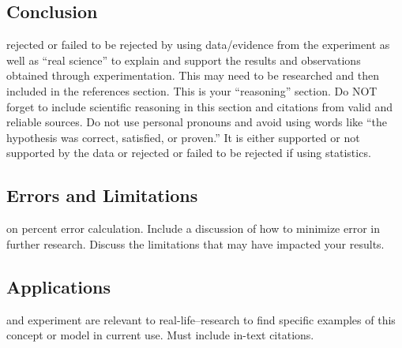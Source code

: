 \documentclass{IEEEmce}
\begin{document}
\subsection{Conclusion}
 rejected or failed to be rejected by using data/evidence from the experiment as well as “real science” to explain and support the results and observations obtained through experimentation.  This may need to be researched and then included in the references section. This is your “reasoning” section. Do NOT forget to include scientific reasoning in this section and citations from valid and reliable sources. Do not use personal pronouns and avoid using words like “the hypothesis was correct, satisfied, or proven.” It is either supported or not supported by the data or rejected or failed to be rejected if using statistics.

\subsection{Errors and Limitations}
 on percent error calculation.  Include a discussion of how to minimize error in further research. Discuss the limitations that may have impacted your results.


\subsection{Applications}
 and experiment are relevant to real-life--research to find specific examples of this concept or model in current use. Must include in-text citations.

\printbibliography
\end{document}
